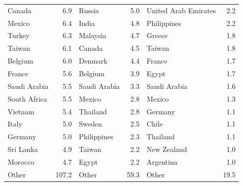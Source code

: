 \begin{table}[!h]
\begin{tabular}[t]{lrlrlr}
Canada & 6.9 & Russia & 5.0 & United Arab Emirates & 2.2\\
Mexico & 6.4 & India & 4.8 & Philippines & 2.2\\
Turkey & 6.3 & Malaysia & 4.7 & Greece & 1.8\\
\addlinespace
Taiwan & 6.1 & Canada & 4.5 & Taiwan & 1.8\\
Belgium & 6.0 & Denmark & 4.4 & France & 1.7\\
France & 5.6 & Belgium & 3.9 & Egypt & 1.7\\
Saudi Arabia & 5.5 & Saudi Arabia & 3.3 & Saudi Arabia & 1.6\\
South Africa & 5.5 & Mexico & 2.8 & Mexico & 1.3\\
\addlinespace
Vietnam & 5.4 & Thailand & 2.8 & Germany & 1.1\\
Italy & 5.0 & Sweden & 2.5 & Chile & 1.1\\
Germany & 5.0 & Philippines & 2.3 & Thailand & 1.1\\
Sri Lanka & 4.9 & Taiwan & 2.2 & New Zealand & 1.0\\
Morocco & 4.7 & Egypt & 2.2 & Argentina & 1.0\\
\addlinespace
Other & 107.2 & Other & 59.3 & Other & 19.5\\
\bottomrule
\end{tabular}
\end{table}
